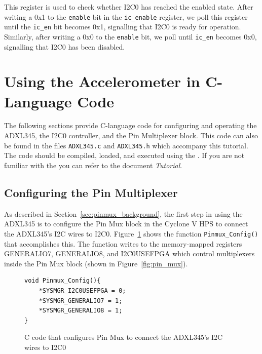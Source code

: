 \documentclass[11pt, twoside, pdftex]{article}
\begin{document}
This register is used to check whether I2C0 has reached the enabled state. After writing a 0x1 to the \texttt{enable} bit in the \texttt{ic\_enable} register, we poll this register until the \texttt{ic\_en} bit becomes 0x1, signalling that I2C0 is ready for operation. Similarly, after writing a 0x0 to the \texttt{enable} bit, we poll until \texttt{ic\_en} becomes 0x0, signalling that I2C0 has been disabled.

\pagebreak
\section{Using the Accelerometer in C-Language Code}
\label{sec:using_accel_in_code}

The following sections provide C-language code for configuring and operating the ADXL345, the I2C0 controller, and the Pin Multiplexer block. This code can also be found in the files \texttt{ADXL345.c} and \texttt{ADXL345.h} which accompany this tutorial. The code should be compiled, loaded, and executed using the \productNameMed{}. If you are not familiar with the \productNameMed{} you can refer to the document \textit{\productNameMed{} Tutorial}. %

\subsection{Configuring the Pin Multiplexer}

As described in Section~\ref{sec:pinmux_background}, the first step in using the ADXL345 is to configure the Pin Mux block in the Cyclone V HPS to connect the ADXL345's I2C wires to I2C0. Figure~\ref{fig:pin_muxing_code_2} shows the function \texttt{Pinmux\_Config()} that accomplishes this. The function writes to the memory-mapped registers GENERALIO7, GENERALIO8, and I2C0USEFPGA which control multiplexers inside the Pin Mux block (shown in Figure~\ref{fig:pin_mux}).

\lstset{language=C,numbers=left}
\begin{figure}[H]
\begin{center}
\begin{minipage}[t]{16 cm}
\begin{lstlisting}
void Pinmux_Config(){
    *SYSMGR_I2C0USEFPGA = 0;
    *SYSMGR_GENERALIO7 = 1;
    *SYSMGR_GENERALIO8 = 1;
}
\end{lstlisting}
\end{minipage}
\end{center}
\vspace{-0.33in}\caption{C code that configures Pin Mux to connect the ADXL345's I2C wires to I2C0}
\label{fig:pin_muxing_code_2}
\end{figure}
\end{document}

